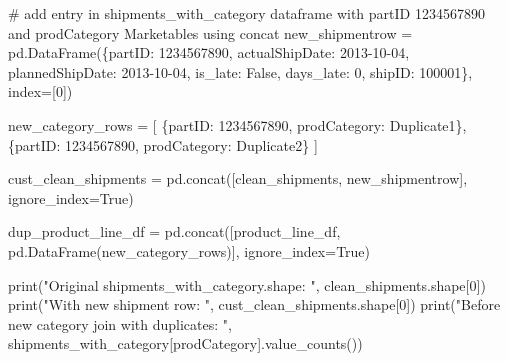 \documentclass[
]{article}
\newenvironment{Shaded}{\begin{snugshade}}{\end{snugshade}}
\newcommand{\BuiltInTok}[1]{\textcolor[rgb]{0.00,0.23,0.31}{#1}}
\newcommand{\CommentTok}[1]{\textcolor[rgb]{0.37,0.37,0.37}{#1}}
\newcommand{\DecValTok}[1]{\textcolor[rgb]{0.68,0.00,0.00}{#1}}
\newcommand{\NormalTok}[1]{\textcolor[rgb]{0.00,0.23,0.31}{#1}}
\newcommand{\OperatorTok}[1]{\textcolor[rgb]{0.37,0.37,0.37}{#1}}
\newcommand{\StringTok}[1]{\textcolor[rgb]{0.13,0.47,0.30}{#1}}
\newcommand{\VariableTok}[1]{\textcolor[rgb]{0.07,0.07,0.07}{#1}}
\begin{document}
\label{key-column-matching}
\begin{Shaded}
\begin{Highlighting}[]
\CommentTok{\# add entry in shipments\_with\_category dataframe with partID 1234567890 and prodCategory Marketables using concat}
\NormalTok{new\_shipmentrow }\OperatorTok{=}\NormalTok{ pd.DataFrame(\{}\StringTok{\textquotesingle{}partID\textquotesingle{}}\NormalTok{: }\StringTok{\textquotesingle{}1234567890\textquotesingle{}}\NormalTok{, }\StringTok{\textquotesingle{}actualShipDate\textquotesingle{}}\NormalTok{: }\StringTok{\textquotesingle{}2013{-}10{-}04\textquotesingle{}}\NormalTok{, }\StringTok{\textquotesingle{}plannedShipDate\textquotesingle{}}\NormalTok{: }\StringTok{\textquotesingle{}2013{-}10{-}04\textquotesingle{}}\NormalTok{, }\StringTok{\textquotesingle{}is\_late\textquotesingle{}}\NormalTok{: }\VariableTok{False}\NormalTok{, }\StringTok{\textquotesingle{}days\_late\textquotesingle{}}\NormalTok{: }\DecValTok{0}\NormalTok{, }\StringTok{\textquotesingle{}shipID\textquotesingle{}}\NormalTok{: }\StringTok{\textquotesingle{}100001\textquotesingle{}}\NormalTok{\}, index}\OperatorTok{=}\NormalTok{[}\DecValTok{0}\NormalTok{])}

\NormalTok{new\_category\_rows }\OperatorTok{=}\NormalTok{ [}
\NormalTok{    \{}\StringTok{\textquotesingle{}partID\textquotesingle{}}\NormalTok{: }\StringTok{\textquotesingle{}1234567890\textquotesingle{}}\NormalTok{, }\StringTok{\textquotesingle{}prodCategory\textquotesingle{}}\NormalTok{: }\StringTok{\textquotesingle{}Duplicate1\textquotesingle{}}\NormalTok{\},}
\NormalTok{    \{}\StringTok{\textquotesingle{}partID\textquotesingle{}}\NormalTok{: }\StringTok{\textquotesingle{}1234567890\textquotesingle{}}\NormalTok{, }\StringTok{\textquotesingle{}prodCategory\textquotesingle{}}\NormalTok{: }\StringTok{\textquotesingle{}Duplicate2\textquotesingle{}}\NormalTok{\}}
\NormalTok{]}

\NormalTok{cust\_clean\_shipments }\OperatorTok{=}\NormalTok{ pd.concat([clean\_shipments, new\_shipmentrow], ignore\_index}\OperatorTok{=}\VariableTok{True}\NormalTok{)}

\NormalTok{dup\_product\_line\_df }\OperatorTok{=}\NormalTok{ pd.concat([product\_line\_df, pd.DataFrame(new\_category\_rows)], ignore\_index}\OperatorTok{=}\VariableTok{True}\NormalTok{)}

\BuiltInTok{print}\NormalTok{(}\StringTok{"Original shipments\_with\_category.shape: "}\NormalTok{, clean\_shipments.shape[}\DecValTok{0}\NormalTok{])}
\BuiltInTok{print}\NormalTok{(}\StringTok{"With new shipment row: "}\NormalTok{, cust\_clean\_shipments.shape[}\DecValTok{0}\NormalTok{])}
\BuiltInTok{print}\NormalTok{(}\StringTok{"Before new category join with duplicates: "}\NormalTok{, shipments\_with\_category[}\StringTok{\textquotesingle{}prodCategory\textquotesingle{}}\NormalTok{].value\_counts())}


\end{Highlighting}
\end{Shaded}
\end{document}
